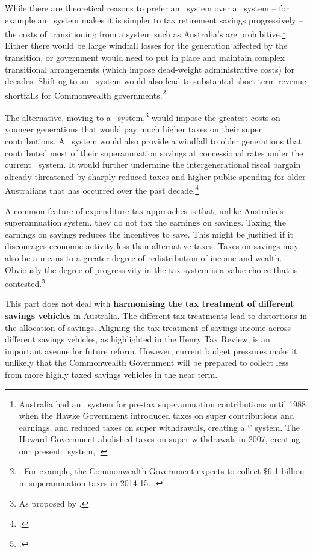 While there are theoretical reasons to prefer an \EET\ system over a \TEE\ system – for example an \EET\ system makes it is simpler to tax retirement savings progressively – the costs of transitioning from a system such as Australia’s are prohibitive.\footnote{Australia had an \EET\ system for pre-tax superannuation contributions until 1988 when the Hawke Government introduced taxes on super contributions and earnings, and reduced taxes on super withdrawals, creating a `\ttt' system. The Howard Government abolished taxes on super withdrawals in 2007, creating our present \ttE\ system, \textcite[][44]{Treasury2008RetirementIncomeConsultPaper}.} Either there would be large windfall losses for the generation affected by the transition, or government would need to put in place and maintain complex transitional arrangements (which impose dead-weight administrative costs) for decades. Shifting to an \EET\ system would also lead to substantial short-term revenue shortfalls for Commonwealth governments.\footnote{\textcite{Mercer2015SubmissionToReThink}. For example, the Commonwealth Government expects to collect \$6.1 billion in superannuation taxes in 2014-15. \textcite[][5]{Treasury2015FinalBudgetOutcome1415}.}

The alternative, moving to a \TEE\ system,\footnote{As proposed by \textcites{MaddockKing2015}{Freebairn2015a}.} would impose the greatest costs on younger generations that would pay much higher taxes on their super contributions. A \TEE\ system would also provide a windfall to older generations that contributed most of their superannuation savings at concessional rates under the current \ttE\ system. It would further undermine the intergenerational fiscal bargain already threatened by sharply reduced taxes and higher public spending for older Australians that has occurred over the past decade.\footcite[][2]{DaleyWoodWeidmannEtAl2014} 

A common feature of expenditure tax approaches is that, unlike Australia’s superannuation system, they do not tax the earnings on savings. Taxing the earnings on savings reduces the incentives to save. This might be justified if it discourages economic activity less than alternative taxes. Taxes on savings may also be a means to a greater degree of redistribution of income and wealth. Obviously the degree of progressivity in the tax system is a value choice that is contested.\footcite{Davidson2015} 

This part does not deal with \textbf{harmonising the tax treatment of different savings vehicles} in Australia. The different tax treatments lead to distortions in the allocation of savings.  Aligning the tax treatment of savings income across different savings vehicles, as highlighted in the Henry Tax Review, is an important avenue for future reform. However, current budget pressures make it unlikely that the Commonwealth Government will be prepared to collect less from more highly taxed savings vehicles in the near term.

